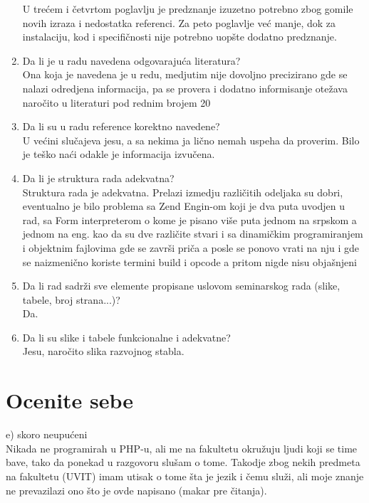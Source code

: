 \documentclass[a4paper]{report}
\begin{document}
\begin{enumerate}
U trećem i četvrtom poglavlju je predznanje izuzetno potrebno zbog gomile novih izraza i nedostatka referenci. Za peto poglavlje već manje, dok za instalaciju, kod i specifičnosti nije potrebno uopšte dodatno predznanje. 
\item Da li je u radu navedena odgovarajuća literatura?\\
Ona koja je navedena je u redu, medjutim nije dovoljno precizirano gde se nalazi odredjena informacija, pa se provera i dodatno informisanje otežava naročito u literaturi pod rednim brojem 20
\item Da li su u radu reference korektno navedene?\\
U većini slučajeva jesu, a sa nekima ja lično nemah uspeha da proverim. Bilo je teško naći odakle je informacija izvučena.
\item Da li je struktura rada adekvatna?\\
Struktura rada je adekvatna. Prelazi izmedju različitih odeljaka su dobri, eventualno je bilo problema sa Zend Engin-om koji je dva puta uvodjen u rad, sa Form interpreterom o kome je pisano više puta jednom na srpskom a jednom na eng. kao da su dve različite stvari i sa dinamičkim programiranjem i objektnim fajlovima gde se završi priča a posle se ponovo vrati na nju i gde se naizmenično koriste termini build i opcode a pritom nigde nisu objašnjeni
\item Da li rad sadrži sve elemente propisane uslovom seminarskog rada (slike, tabele, broj strana...)?\\
Da. 
\item Da li su slike i tabele funkcionalne i adekvatne?\\
Jesu, naročito slika razvojnog stabla. 
\end{enumerate}

\section{Ocenite sebe}
 e) skoro neupućeni\\
Nikada ne programirah u PHP-u, ali me na fakultetu okružuju ljudi koji se time bave, tako da ponekad u razgovoru slušam o tome. Takodje zbog nekih predmeta na fakultetu (UVIT) imam utisak o tome šta je jezik i čemu služi, ali moje znanje ne prevazilazi ono što je ovde napisano (makar pre čitanja). 
\end{document}
